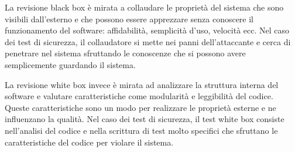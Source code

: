 \documentclass[answers, a4paper, 11pt]{exam}
\begin{document}
\begin{questions}
\begin{parts}
\begin{solution}
La revisione black box è mirata a collaudare le proprietà del sistema che sono visibili dall'esterno e che possono essere apprezzare senza conoscere il funzionamento del software: affidabilità, semplicità d'uso, velocità ecc.
Nel caso dei test di sicurezza, il collaudatore si mette nei panni dell'attaccante e cerca di penetrare nel sistema sfruttando le conoscenze che si possono avere semplicemente guardando il sistema. 

La revisione white box invece è mirata ad analizzare la struttura interna del software e valutare caratteristiche come modularità e leggibilità del codice.
Queste caratteristiche sono un modo per realizzare le proprietà esterne e ne influenzano la qualità.
Nel caso dei test di sicurezza, il test white box consiste nell'analisi del codice e nella scrittura di test molto specifici che sfruttano le caratteristiche del codice per violare il sistema. 
\end{solution}

\end{parts}
\end{questions}
\end{document}

